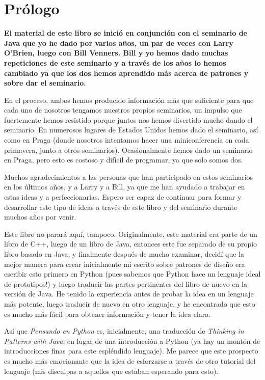 \section*{Prólogo}
\label{sec:prolo}

\textbf{El material de este libro se inició en conjunción con el seminario de Java que yo he dado por varios años, un par de veces con Larry O’Brien, luego con Bill Venners. Bill y yo hemos dado muchas repeticiones de este seminario y a través de los años lo hemos cambiado ya que los dos hemos aprendido más acerca de patrones y sobre dar el seminario.}\newline

En el proceso, ambos hemos producido información más que suficiente para que cada uno de nosotros tengamos nuestros propios seminarios, un impulso que fuertemente hemos resistido porque juntos nos hemos divertido mucho dando el seminario. En numerosos lugares de Estados Unidos hemos dado el seminario, así como en Praga (donde nosotros intentamos hacer una miniconferencia en cada primavera, junto a otros seminarios). Ocasionalmente hemos dado  un seminario en Praga, pero esto es costoso y difícil de programar, ya que solo somos dos.\newline

Muchos agradecimientos a las personas que han participado en estos seminarios en los últimos años, y a Larry y a Bill, ya que me han ayudado a trabajar en estas ideas y a perfeccionarlas. Espero ser capaz de continuar para formar y desarrollar este tipo de ideas a través de este libro y del seminario durante muchos años por venir. \newline 

Este libro no parará aquí, tampoco. Originalmente, este material era parte de un libro de C++, luego de un libro de Java, entonces este fue separado de su propio libro basado en Java, y finalmente después de mucho examinar, decidí que la mejor manera para crear inicialmente mi escrito sobre patrones de diseño era escribir esto primero en Python (pues sabemos que Python hace un lenguaje ideal de prototipos!) y luego traducir las partes pertinentes del libro de nuevo en la versión de Java.  He tenido la experiencia antes de probar la idea en un lenguaje más potente, luego traducir de nuevo en otro lenguaje, y he encontrado que esto es mucho más fácil para obtener información y tener la idea clara.\newline

Así que \textit{Pensando en Python} es, inicialmente, una traducción de \textit{Thinking in Patterns with Java}, en lugar de una introducción a Python (ya hay un montón de introducciones finas para este espléndido lenguaje). Me parece que este prospecto es mucho más emocionante que la idea de esforzarse a través de otro tutorial del lenguaje (mis disculpas a aquellos que estaban esperando para esto).

\newpage 